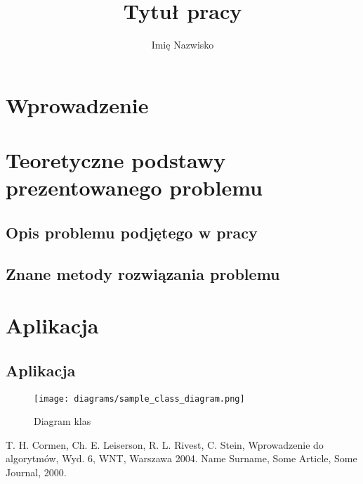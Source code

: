 \documentclass[polski, bsc]{iithesis}
\title{Tytuł pracy}
\author{Imię Nazwisko}
\begin{document}
    \maketitle

    \begin{abstract}
        \lipsum[2-4]
    \end{abstract}

    \clearpage
    \tableofcontents

    \listoffigures
    \clearpage

    \cleardoublepage


    \section{Wprowadzenie}


    \section{Teoretyczne podstawy prezentowanego problemu}

    \subsection{Opis problemu podjętego w pracy}

    \subsection{Znane metody rozwiązania problemu}


    \section{Aplikacja}

    \subsection{Aplikacja}

    \begin{figure}[H]
        \caption{Diagram klas}
        \label{fig:class_diagram}
        \centering
        \texttt{[image: diagrams/sample\_class\_diagram.png]}
    \end{figure}

    \begin{thebibliography}{2}
        T. H. Cormen, Ch. E. Leiserson, R. L. Rivest, C. Stein,
        Wprowadzenie do algorytmów, Wyd. 6, WNT, Warszawa 2004.
        Name Surname, Some Article, Some Journal, 2000.
    \end{thebibliography}
\end{document}
